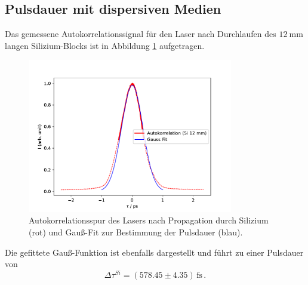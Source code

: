    \subsection{Pulsdauer mit dispersiven Medien}
        Das gemessene Autokorrelationssignal für den Laser nach Durchlaufen des $\SI{12}{\milli\metre}$ langen Silizium-Blocks ist in Abbildung \ref{fig:Si} aufgetragen.
        \begin{figure}
            \centering
            \includegraphics[width = 0.8\textwidth]{pictures/Puls_Si.pdf}
            \caption{Autokorrelationsspur des Lasers nach Propagation durch Silizium (rot) und Gauß-Fit zur Bestimmung der Pulsdauer (blau).}
            \label{fig:Si}    
        \end{figure}        
        Die gefittete Gauß-Funktion ist ebenfalls dargestellt und führt zu einer Pulsdauer von
        \begin{equation}
            \Delta \tau^{Si} = (578.45\pm 4.35)\,\text{fs} \, .
        \end{equation}
        
